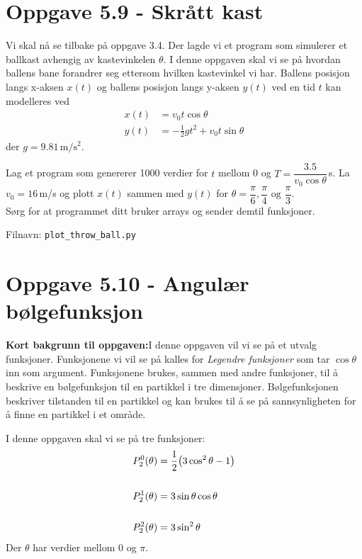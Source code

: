 \documentclass[10pt,a4paper]{article}
\begin{document}
\section*{Oppgave 5.9 - Skrått kast}
Vi skal nå se tilbake på oppgave 3.4. Der lagde vi et program som simulerer et ballkast avhengig av kastevinkelen $\theta$. I denne oppgaven skal vi se på hvordan ballens bane forandrer seg ettersom hvilken kastevinkel vi har.
Ballens posisjon langs x-aksen $x(t)$ og ballens posisjon langs y-aksen $y(t)$ ved en tid $t$ kan modelleres ved
\begin{align*}
	x(t) &= v_0t\cos\theta \\
	y(t) &= -\frac{1}{2}g t^2 + v_0t\sin\theta
\end{align*}
der $g = 9.81\,\mathrm{m/s^2}$.

Lag et program som genererer 1000 verdier for $t$ mellom 0 og $T = \dfrac{3.5 }{v_0\cos\theta}\,$s. La $v_0 = 16\,$m/s og plott $x(t)$ sammen med $y(t)$ for $\theta = \dfrac{\pi}{6},\dfrac{\pi}{4} \text{ og }\dfrac{\pi}{3}$.  \\
Sørg for at programmet ditt bruker arrays og sender demtil funksjoner.

Filnavn: \texttt{plot\_throw\_ball.py}


\section*{Oppgave 5.10 - Angulær bølgefunksjon}
\textbf{Kort bakgrunn til oppgaven:}I denne oppgaven vil vi se på et utvalg funksjoner. Funksjonene vi vil se på kalles for \textit{Legendre funksjoner} som tar $\cos\theta$ inn som argument.  Funksjonene brukes, sammen med andre funksjoner, til å beskrive en bølgefunksjon til en partikkel i tre dimensjoner. Bølgefunksjonen beskriver tilstanden til en partikkel og kan brukes til å se på sannsynligheten for å finne en partikkel i et område.


I denne oppgaven skal vi se på tre funksjoner:
\begin{align*}
	P_2^0(\theta) &= \frac{1}{2}\qty(3\cos^2\theta - 1) \\
	\hfill \\
	P_2^1(\theta) &= 3\sin\theta\cos\theta \\
	\hfill \\
	P_2^2(\theta) &= 3\sin^2\theta
\end{align*}
Der $\theta$ har verdier mellom 0 og $\pi$.
\end{document}
